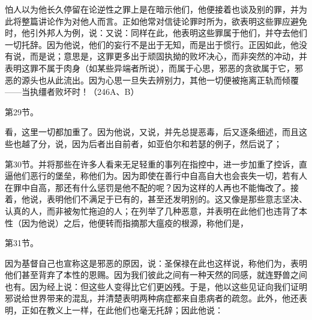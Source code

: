 \par

\par

怕人以为他长久停留在论逆性之罪上是在暗示他们，他便接着也谈及别的罪，并为此将整篇讲论作为对他人而言。正如他常对信徒论罪时所为，欲表明这些罪应避免时，他引外邦人为例，说：又说：同样在此，他表明这些罪属于他们，并夺去他们一切托辞。因为他说，他们的妄行不是出于无知，而是出于惯行。正因如此，他没有说，而是说；意思是，这罪更多出于顽固执拗的败坏决心，而非突然的冲动，并表明这罪不属于肉身（如某些异端者所说），而属于心思，邪恶的贪欲属于它，邪恶的源头也从此流出。因为心思一旦失去辨别力，其他一切便被拖离正轨而倾覆——当执缰者败坏时！（246A、B）\par

第29节。\par

看，这里一切都加重了。因为他说，又说，并先总提恶毒，后又逐条细述，而且这些也越了分，说，因为后者出自前者，如亚伯尔和若瑟的例子，然后说了；\par

第30节。并将那些在许多人看来无足轻重的事列在指控中，进一步加重了控诉，直逼他们恶行的堡垒，称他们为。因为即使在善行中自高自大也会丧失一切，若有人在罪中自高，那还有什么惩罚是他不配的呢？因为这样的人再也不能悔改了。接着，他说，表明他们不满足于已有的，甚至还发明别的。这又像是那些意志坚决、认真的人，而非被匆忙拖迫的人；在列举了几种恶意，并表明在此他们也违背了本性（因为他说）之后，他便转而指摘那大瘟疫的根源，称他们是，\par

第31节。\par

因为基督自己也宣称这是邪恶的原因，说：圣保禄在此也这样说，称他们为，表明他们甚至背弃了本性的恩赐。因为我们彼此之间有一种天然的同感，就连野兽之间也有。因为经上说：但这些人变得比它们更凶残。于是，他以这些见证向我们证明邪说给世界带来的混乱，并清楚表明两种病症都来自患病者的疏忽。此外，他还表明，正如在教义上一样，在此他们也毫无托辞；因此他说：\par

